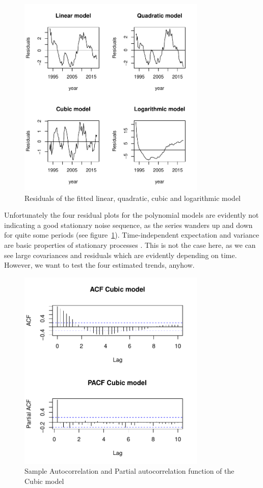 \documentclass[11pt,a4paper]{article}
\begin{document}
\begin{figure}[!htb]
\centering
\includegraphics[angle=0,
width=0.8\textwidth]{resid_polynomials}
\caption{Residuals of the fitted linear, quadratic, cubic and logarithmic model
\label{fig:resid_polynomials}}
\end{figure}
Unfortunately the four residual plots for the polynomial models are evidently not indicating a good stationary noise sequence, as the series wanders up and down for quite some periods (see figure~\ref{fig:resid_polynomials}). Time-independent expectation and variance are basic properties of stationary processes \cite[p.~49]{bd02}. This is not the case here, as we can see large covariances and residuals which are evidently depending on time. However, we want to test the four estimated trends, anyhow.
\\
\begin{figure}[!htb]
\centering
\includegraphics[angle=0,
width=0.8\textwidth]{acf_pacf_cubicmodel}
\caption{Sample Autocorrelation and Partial autocorrelation function of the Cubic model
\label{fig:acf_cubicmodel}}
\end{figure}
\end{document}
